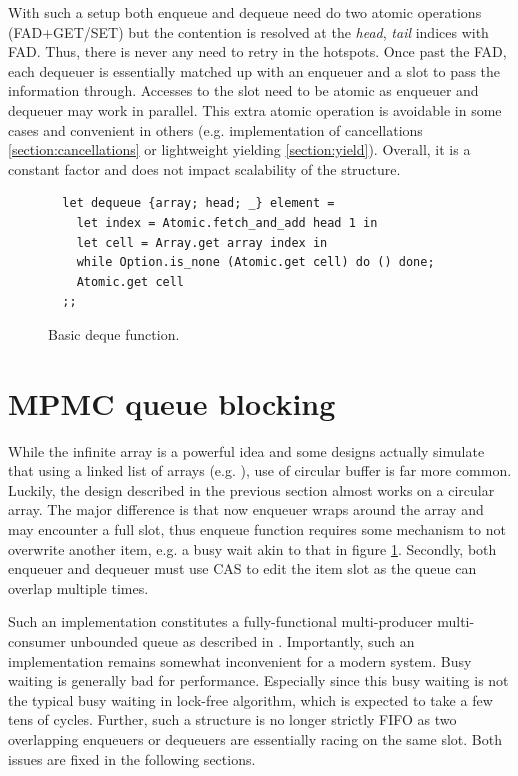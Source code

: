 \documentclass[12pt,a4paper,twoside]{report}
\begin{document}
With such a setup both enqueue and dequeue need do two atomic operations (FAD+GET/SET) but the contention is resolved at the \textit{head}, \textit{tail} indices with FAD. Thus, there is never any need to retry in the hotspots. Once past the FAD, each dequeuer is essentially matched up with an enqueuer and a slot to pass the information through. Accesses to the slot need to be atomic as enqueuer and dequeuer may work in parallel. This extra atomic operation is avoidable in some cases and convenient in others (e.g. implementation of cancellations \ref{section:cancellations} or lightweight yielding \ref{section:yield}). Overall, it is a constant factor and does not impact scalability of the structure.


\begin{figure} 
    \centering
    \begin{verbatim}
  let dequeue {array; head; _} element = 
    let index = Atomic.fetch_and_add head 1 in
    let cell = Array.get array index in 
    while Option.is_none (Atomic.get cell) do () done;
    Atomic.get cell
  ;;
    \end{verbatim}
    \caption{Basic deque function.}
    \label{fig:basic-deque}
\end{figure}

\section{MPMC queue blocking}
\label{section:blocking_mpmc}

While the infinite array is a powerful idea and some designs actually simulate that using a linked list of arrays (e.g. \cite{Sundell2011}), use of circular buffer is far more common. Luckily, the design described in the previous section almost works on a circular array. The major difference is that now enqueuer wraps around the array and may encounter a full slot, thus enqueue function requires some mechanism to not overwrite another item, e.g. a busy wait akin to that in figure \ref{fig:basic-deque}. Secondly, both enqueuer and dequeuer must use CAS to edit the item slot as the queue can overlap multiple times. 

Such an implementation constitutes a fully-functional multi-producer multi-consumer unbounded queue as described in \cite{Kappes2021}. Importantly, such an implementation remains somewhat inconvenient for a modern system. Busy waiting is generally bad for performance. Especially since this busy waiting is not the typical busy waiting in lock-free algorithm, which is expected to take a few tens of cycles. Further, such a structure is no longer strictly FIFO as two overlapping enqueuers or dequeuers are essentially racing on the same slot. Both issues are fixed in the following sections. 
\end{document}
